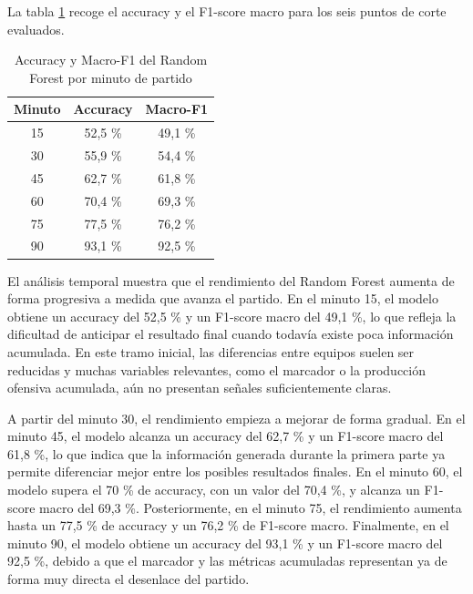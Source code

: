 La tabla \ref{tab:rf_por_minuto} recoge el accuracy y el F1-score macro para los seis puntos de corte evaluados.

\begin{table}[H]
    \centering
    \begin{tabular}{ccc}
        \hline
        \textbf{Minuto} & \textbf{Accuracy} & \textbf{Macro-F1} \\
        \hline
        15              & 52,5 \%           & 49,1 \%           \\
        30              & 55,9 \%           & 54,4 \%           \\
        45              & 62,7 \%           & 61,8 \%           \\
        60              & 70,4 \%           & 69,3 \%           \\
        75              & 77,5 \%           & 76,2 \%           \\
        90              & 93,1 \%           & 92,5 \%           \\
        \hline
    \end{tabular}
    \caption{Accuracy y Macro-F1 del Random Forest por minuto de partido}
    \label{tab:rf_por_minuto}
\end{table}

El análisis temporal muestra que el rendimiento del Random Forest aumenta de forma progresiva a medida que avanza el partido. En el minuto 15, el modelo obtiene un accuracy del 52,5 \% y un F1-score macro del 49,1 \%, lo que refleja la dificultad de anticipar el resultado final cuando todavía existe poca información acumulada. En este tramo inicial, las diferencias entre equipos suelen ser reducidas y muchas variables relevantes, como el marcador o la producción ofensiva acumulada, aún no presentan señales suficientemente claras.

A partir del minuto 30, el rendimiento empieza a mejorar de forma gradual. En el minuto 45, el modelo alcanza un accuracy del 62,7 \% y un F1-score macro del 61,8 \%, lo que indica que la información generada durante la primera parte ya permite diferenciar mejor entre los posibles resultados finales. En el minuto 60, el modelo supera el 70 \% de accuracy, con un valor del 70,4 \%, y alcanza un F1-score macro del 69,3 \%. Posteriormente, en el minuto 75, el rendimiento aumenta hasta un 77,5 \% de accuracy y un 76,2 \% de F1-score macro. Finalmente, en el minuto 90, el modelo obtiene un accuracy del 93,1 \% y un F1-score macro del 92,5 \%, debido a que el marcador y las métricas acumuladas representan ya de forma muy directa el desenlace del partido.

